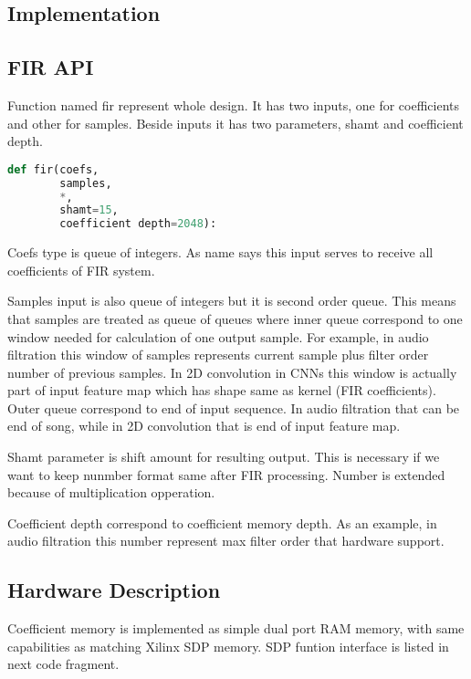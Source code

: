 \documentclass[a4paper, 12pt]{article}
\begin{document}
\subsection{Implementation}
\subsection{FIR API}


Function named fir represent whole design. It has two inputs, one for coefficients and other for samples. Beside inputs it has two parameters, shamt and coefficient depth.

\begin{lstlisting}[language=Python, caption=FIR function]
def fir(coefs,
        samples,
        *,
        shamt=15,
        coefficient depth=2048):
\end{lstlisting}

Coefs type is queue of integers. As name says this input serves to receive all coefficients of FIR system. 

Samples input is also queue of integers but it is second order queue. This means that samples are treated as queue of queues where inner queue correspond to one window needed for calculation of one output sample. For example, in audio filtration this window of samples represents current sample plus filter order number of previous samples. In 2D convolution in CNNs this window is actually part of input feature map which has shape same as kernel (FIR coefficients). Outer queue correspond to end of input sequence. In audio filtration that can be end of song, while in 2D convolution that is end of input feature map.

Shamt parameter is shift amount for resulting output. This is necessary if we want to keep nunmber format same after FIR processing. Number is extended because of multiplication opperation.

Coefficient depth correspond to coefficient memory depth. As an example, in audio filtration this number represent max filter order that hardware support. 

\subsection{Hardware Description}

Coefficient memory is implemented as simple dual port RAM memory, with same capabilities as matching Xilinx SDP memory. SDP funtion interface is
listed in next code fragment.
\end{document}
